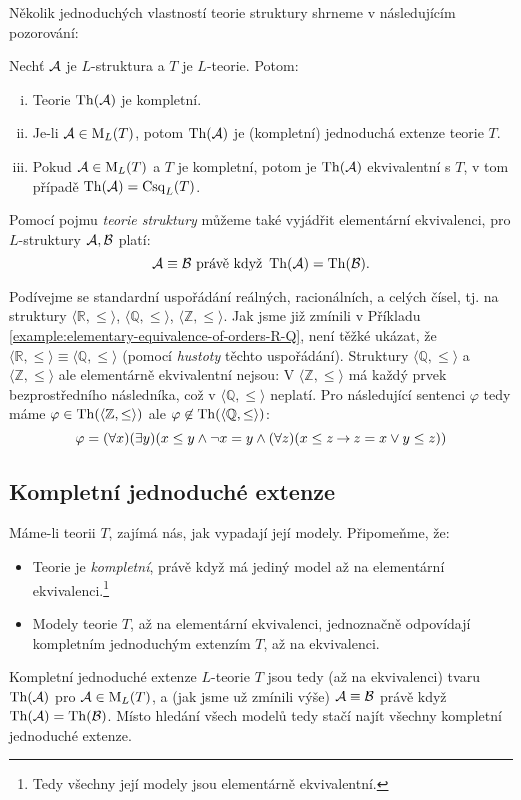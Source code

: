 Několik jednoduchých vlastností teorie struktury shrneme v následujícím pozorování:

\begin{observation}
    Nechť $\mathcal{A}$ je $L$-struktura a $T$ je $L$-teorie. Potom:
    \begin{enumerate}[(i)]
        \item Teorie $\operatorname{Th}(\mathcal{A})$ je kompletní.
        \item Je-li $\mathcal{A}\in\operatorname{M}_L(T)$, potom $\operatorname{Th}(\mathcal{A})$ je (kompletní) jednoduchá extenze teorie $T$.
        \item Pokud $\mathcal{A}\in\operatorname{M}_L(T)$ a $T$ je kompletní, potom je $\operatorname{Th}(\mathcal{A})$ ekvivalentní s $T$, v tom případě $\operatorname{Th}(\mathcal{A})=\operatorname{Csq}_L(T)$.
    \end{enumerate}    
\end{observation}

Pomocí pojmu \emph{teorie struktury} můžeme také vyjádřit elementární ekvivalenci, pro $L$-struktury $\mathcal{A},\mathcal{B}$ platí:
$$
\mathcal{A}\equiv\mathcal{B} \text{ právě když }\operatorname{Th}(\mathcal{A})=\operatorname{Th}(\mathcal{B}).
$$

\begin{example}
   Podívejme se standardní uspořádání reálných, racionálních, a celých čísel, tj. na struktury $\langle\mathbb R,\leq\rangle$, $\langle\mathbb Q,\leq\rangle$, $\langle\mathbb Z,\leq\rangle$. Jak jsme již zmínili v Příkladu \ref{example:elementary-equivalence-of-orders-R-Q}, není těžké ukázat, že $\langle\mathbb R,\leq\rangle\equiv\langle\mathbb Q,\leq\rangle$ (pomocí \emph{hustoty} těchto uspořádání). Struktury $\langle\mathbb Q,\leq\rangle$ a $\langle\mathbb Z,\leq\rangle$ ale elementárně ekvivalentní nejsou: V $\langle\mathbb Z,\leq\rangle$ má každý prvek bezprostředního následníka, což v $\langle\mathbb Q,\leq\rangle$ neplatí. Pro následující sentenci $\varphi$ tedy máme $\varphi\in\operatorname{Th}(\langle\mathbb Z,\leq\rangle)$ ale $\varphi\not\in\operatorname{Th}(\langle\mathbb Q,\leq\rangle)$:
   $$
   \varphi=(\forall x)(\exists y)(x\leq y\land \neg x=y\land(\forall z)(x\leq z\mathbin{\rightarrow} z=x\lor y\leq z))
   $$
\end{example}


\subsection{Kompletní jednoduché extenze}

Máme-li teorii $T$, zajímá nás, jak vypadají její modely. Připomeňme, že:
\begin{itemize}
    \item Teorie je \emph{kompletní}, právě když má jediný model až na elementární ekvivalenci.\footnote{Tedy všechny její modely jsou elementárně ekvivalentní.}
    \item Modely teorie $T$, až na elementární ekvivalenci, jednoznačně odpovídají kompletním jednoduchým extenzím $T$, až na ekvivalenci.
\end{itemize}
Kompletní jednoduché extenze $L$-teorie $T$ jsou tedy (až na ekvivalenci) tvaru $\operatorname{Th}(\mathcal{A})$ pro $\mathcal{A}\in\operatorname{M}_L(T)$, a (jak jsme už zmínili výše) $\mathcal{A}\equiv\mathcal{B}$ právě když $\operatorname{Th}(\mathcal{A})=\operatorname{Th}(\mathcal{B})$. Místo hledání všech modelů tedy stačí najít všechny kompletní jednoduché extenze.

